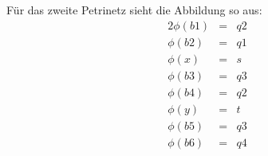 \documentclass[10pt,a4paper,oneside,ngerman,numbers=noenddot]{scrartcl}
\begin{document}
	Für das zweite Petrinetz sieht die Abbildung so aus:
	\begin{alignat*}{2}
		\phi(b1) &=& q2 \\
		\phi(b2) &=& q1 \\
		\phi(x) &=& s \\
		\phi(b3) &=& q3 \\
		\phi(b4) &=& q2 \\
		\phi(y) &=& t \\
		\phi(b5) &=& q3 \\
		\phi(b6) &=& q4
	\end{alignat*}
\end{document}

